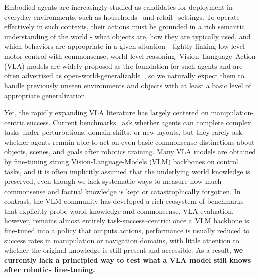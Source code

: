 \documentclass{llmxive}
\begin{document}
Embodied agents are increasingly studied as candidates for deployment in everyday environments, such as households~\cite{shukla2024maniskill, calvin, libero} and retail~\cite{soshin2025robobenchmart, liu2025fetchbot} settings. 
To operate effectively in such contexts, their actions must be grounded in a rich semantic understanding of the world - what objects are, how they are typically used, and which behaviors are appropriate in a given situation - tightly linking low-level motor control with commonsense, world-level reasoning.
Vision--Language--Action (VLA) models are widely proposed as the foundation for such agents and are often advertised as open-world-generalizable~\cite{pi0, openvla, magma, spatialvla, patratskiy2025spatial}, so we naturally expect them to handle previously unseen environments and objects with at least a basic level of appropriate generalization.

Yet, the rapidly expanding VLA literature has largely centered on manipulation-centric success.
Current benchmarks~\cite{libero, calvin, shukla2024maniskill, soshin2025robobenchmart, behavior1k, vlabench} ask whether agents can complete complex tasks under perturbations, domain shifts, or new layouts, but they rarely ask whether agents remain able to act on even basic commonsense distinctions about objects, scenes, and goals after robotics training.
Many VLA models are obtained by fine-tuning strong Vision-Language-Models (VLM) backbones on control tasks, and it is often implicitly assumed that the underlying world knowledge is preserved, even though we lack systematic ways to measure how much commonsense and factual knowledge is kept or catastrophically forgotten. In contrast, the VLM community has developed a rich ecosystem of benchmarks that explicitly probe world knowledge and commonsense. VLA evaluation, however, remains almost entirely task-success--centric: once a VLM backbone is fine-tuned into a policy that outputs actions, performance is usually reduced to success rates in manipulation or navigation domains, with little attention to whether the original knowledge is still present and accessible.
As a result, \textbf{we currently lack a principled way to test what a VLA model still knows after robotics fine-tuning.}
\end{document}
